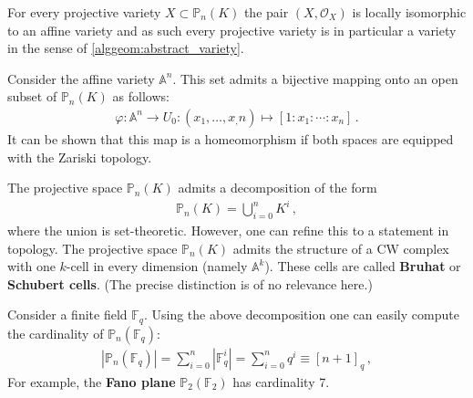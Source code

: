     \begin{property}[Variety]
        For every projective variety $X\subset\mathbb{P}_n(K)$ the pair $(X, \mathcal{O}_X)$ is locally isomorphic to an affine variety and as such every projective variety is in particular a variety in the sense of \cref{alggeom:abstract_variety}.
    \end{property}
    \begin{property}
        Consider the affine variety $\mathbb{A}^n$. This set admits a bijective mapping onto an open subset of $\mathbb{P}_n(K)$ as follows:
        \begin{gather}
            \varphi:\mathbb{A}^n\rightarrow U_0:(x_1,\ldots,x_,n)\mapsto[1:x_1:\cdots:x_n]\,.
        \end{gather}
        It can be shown that this map is a homeomorphism if both spaces are equipped with the Zariski topology.
    \end{property}

    \begin{property}
        The projective space $\mathbb{P}_n(K)$ admits a decomposition of the form
        \begin{gather}
            \mathbb{P}_n(K) = \bigcup_{i=0}^nK^i\,,
        \end{gather}
        where the union is set-theoretic. However, one can refine this to a statement in topology. The projective space $\mathbb{P}_n(K)$ admits the structure of a CW complex with one $k$-cell in every dimension (namely $\mathbb{A}^k$). These cells are called \textbf{Bruhat} or \textbf{Schubert cells}. (The precise distinction is of no relevance here.)
    \end{property}

    \begin{example}
        Consider a finite field $\mathbb{F}_q$. Using the above decomposition one can easily compute the cardinality of $\mathbb{P}_n(\mathbb{F}_q)$:
        \begin{gather}
            |\mathbb{P}_n(\mathbb{F}_q)| = \sum_{i=0}^n|\mathbb{F}_q^i| = \sum_{i=0}^nq^i \equiv [n+1]_q\,,
        \end{gather}
        For example, the \textbf{Fano plane} $\mathbb{P}_2(\mathbb{F}_2)$ has cardinality 7.
    \end{example}

